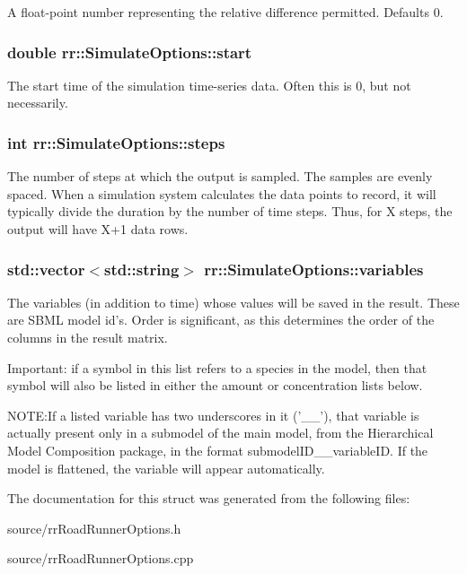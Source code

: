 A float-\/point number representing the relative difference permitted. Defaults 0. \hypertarget{structrr_1_1_simulate_options_ae25c38171cedd08bf0cc43932c07822e}{
\subsubsection[{start}]{\setlength{\rightskip}{0pt plus 5cm}double rr\-::\-Simulate\-Options\-::start}}\label{structrr_1_1_simulate_options_ae25c38171cedd08bf0cc43932c07822e}
The start time of the simulation time-\/series data. Often this is 0, but not necessarily. \hypertarget{structrr_1_1_simulate_options_a20008b16d84ef52a564648671d0c544b}{
\subsubsection[{steps}]{\setlength{\rightskip}{0pt plus 5cm}int rr\-::\-Simulate\-Options\-::steps}}\label{structrr_1_1_simulate_options_a20008b16d84ef52a564648671d0c544b}
The number of steps at which the output is sampled. The samples are evenly spaced. When a simulation system calculates the data points to record, it will typically divide the duration by the number of time steps. Thus, for X steps, the output will have X+1 data rows. \hypertarget{structrr_1_1_simulate_options_a0953c07a719d03a4d558a9bf2ce16f83}{
\subsubsection[{variables}]{\setlength{\rightskip}{0pt plus 5cm}std\-::vector$<$std\-::string$>$ rr\-::\-Simulate\-Options\-::variables}}\label{structrr_1_1_simulate_options_a0953c07a719d03a4d558a9bf2ce16f83}
The variables (in addition to time) whose values will be saved in the result. These are S\-B\-M\-L model id's. Order is significant, as this determines the order of the columns in the result matrix.

Important\-: if a symbol in this list refers to a species in the model, then that symbol will also be listed in either the amount or concentration lists below.

N\-O\-T\-E\-:If a listed variable has two underscores in it ('\-\_\-\-\_\-'), that variable is actually present only in a submodel of the main model, from the Hierarchical Model Composition package, in the format submodel\-I\-D\-\_\-\-\_\-variable\-I\-D. If the model is flattened, the variable will appear automatically. 

The documentation for this struct was generated from the following files\-:\begin{DoxyCompactItemize}
\item 
source/rr\-Road\-Runner\-Options.\-h\item 
source/rr\-Road\-Runner\-Options.\-cpp\end{DoxyCompactItemize}
